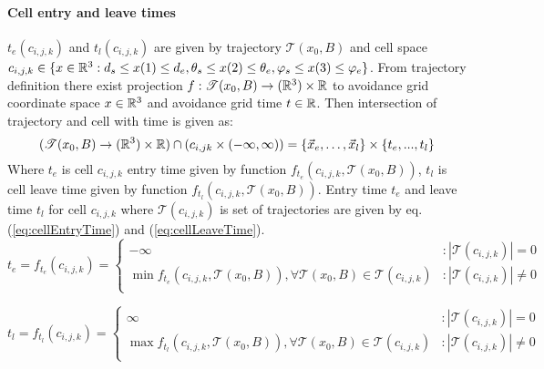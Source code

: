 \paragraph{Cell entry and leave times} $t_e(c_{i,j,k})$ and $t_l(c_{i,j,k})$ are given by trajectory $\mathscr{T}(x_0,B)$ and cell space $c_{i,j,k}\in\{x\in\mathbb{R}^3:d_s \le x(1) \le d_e, \theta_s \le x(2) \le \theta_e, \varphi_s \le x(3) \le \varphi_e \}$. From trajectory definition there exist projection $f:\mathscr{T}(x_0,B)\to (\mathbb{R}^3)\times \mathbb{R}$ to avoidance grid coordinate space $x\in \mathbb{R}^3$ and avoidance grid time $t\in\mathbb{R}$. Then intersection of trajectory and cell with time is given as:
\begin{equation}
    (\mathscr{T}(x_0,B)\to (\mathbb{R}^3)\times \mathbb{R})\cap(c_{i,jk}\times (-\infty,\infty))=\left\{ \vec{x}_e,\dots,\vec{x}_l \right\}\times \left\{ t_e,...,t_l\right\}
\end{equation}
\noindent Where $t_e$ is cell $c_{i,j,k}$ entry time given by function $f_{t_e}(c_{i,j,k},\mathscr{T}(x_0,B))$, $t_l$ is cell leave time given by function $f_{t_l}(c_{i,j,k},\mathscr{T}(x_0,B))$. Entry time $t_e$ and leave time $t_l$ for cell $c_{i,j,k}$ where $\mathscr{T}(c_{i,j,k})$ is set of trajectories are given by eq. (\ref{eq:cellEntryTime}) and (\ref{eq:cellLeaveTime}).
\begin{equation}\label{eq:cellEntryTime}
    t_e=f_{t_e}(c_{i,j,k})=
    \begin{cases}
        -\infty&:|\mathscr{T}(c_{i,j,k})|=0\\
        \min f_{t_e}(c_{i,j,k},\mathscr{T}(x_0,B)),\forall\mathscr{T}(x_0,B)\in \mathscr{T}(c_{i,j,k})&:|\mathscr{T}(c_{i,j,k})|\neq 0\\
    \end{cases}
\end{equation}

\begin{equation}\label{eq:cellLeaveTime}
    t_l=f_{t_l}(c_{i,j,k})=
    \begin{cases}
        \infty&:|\mathscr{T}(c_{i,j,k})|=0\\
        \max f_{t_l}(c_{i,j,k},\mathscr{T}(x_0,B)),\forall\mathscr{T}(x_0,B)\in \mathscr{T}(c_{i,j,k})&:|\mathscr{T}(c_{i,j,k})|\neq 0\\
    \end{cases}
\end{equation}

